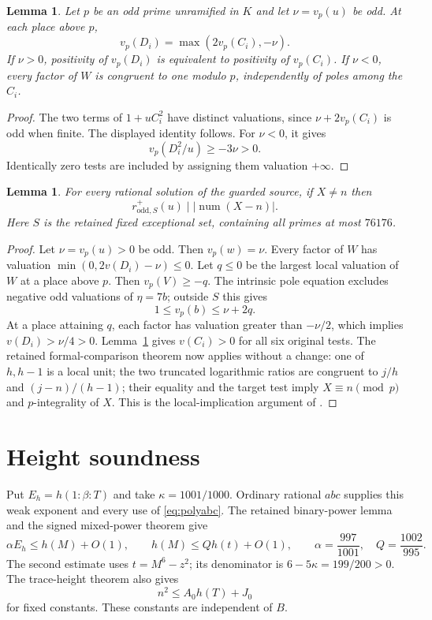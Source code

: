 \documentclass[11pt,a4paper]{article}
\newtheorem{lemma}[theorem]{Lemma}
\begin{document}
\begin{lemma}\label{lem:balanced}
Let $p$ be an odd prime unramified in $K$ and let $\nu=v_p(u)$ be odd.
At each place above $p$,
\[
                  v_p(D_i)=\max(2v_p(C_i),-\nu).
\]
If $\nu>0$, positivity of $v_p(D_i)$ is equivalent to positivity of
$v_p(C_i)$. If $\nu<0$, every factor of $W$ is congruent to one
modulo $p$, independently of poles among the $C_i$.
\end{lemma}
\begin{proof}
The two terms of $1+uC_i^2$ have distinct valuations, since
$\nu+2v_p(C_i)$ is odd when finite. The displayed identity follows.
For $\nu<0$, it gives
\[
                v_p(D_i^2/u)\ge-3\nu>0.
\]
Identically zero tests are included by assigning them valuation
$+\infty$.
\end{proof}

\begin{lemma}\label{lem:extract}
For every rational solution of the guarded source, if $X\ne n$ then
\[
              r^+_{\mathrm{odd},S}(u)\mid |\operatorname{num}(X-n)|.
\]
Here $S$ is the retained fixed exceptional set, containing all primes
at most $76176$.
\end{lemma}
\begin{proof}
Let $\nu=v_p(u)>0$ be odd. Then $v_p(w)=\nu$.
Every factor of $W$ has valuation
$\min(0,2v(D_i)-\nu)\le0$. Let $q\le0$ be the largest local
valuation of $W$ at a place above $p$. Then $v_p(V)\ge-q$.
The intrinsic pole equation excludes negative odd valuations of
$\eta=7b$; outside $S$ this gives
\[
                    1\le v_p(b)\le\nu+2q.
\]
At a place attaining $q$, each factor has valuation greater than
$-\nu/2$, which implies $v(D_i)>\nu/4>0$.
Lemma~\ref{lem:balanced} gives $v(C_i)>0$ for all six original tests.
The retained formal-comparison theorem now applies without a change:
one of $h,h-1$ is a local unit; the two truncated logarithmic ratios
are congruent to $j/h$ and $(j-n)/(h-1)$; their equality and the
target test imply $X\equiv n\pmod p$ and $p$-integrality of $X$.
This is the local-implication argument of \cite[Section 4]{Conditional}.
\end{proof}

\section{Height soundness}

Put $E_h=h(1:\beta:T)$ and take $\kappa=1001/1000$.
Ordinary rational $abc$ supplies this weak exponent and every use of
\eqref{eq:polyabc}. The retained binary-power lemma and the signed
mixed-power theorem \cite{Signed} give
\begin{equation}\label{eq:rootbounds}
 \alpha E_h\le h(M)+O(1),\qquad
 h(M)\le Qh(t)+O(1),\qquad
 \alpha=\frac{997}{1001},\quad Q=\frac{1002}{995}.
\end{equation}
The second estimate uses $t=M^6-z^2$; its denominator is
$6-5\kappa=199/200>0$.
The trace-height theorem also gives
\[
                     n^2\le A_0h(T)+J_0
\]
for fixed constants. These constants are independent of $B$.
\end{document}
